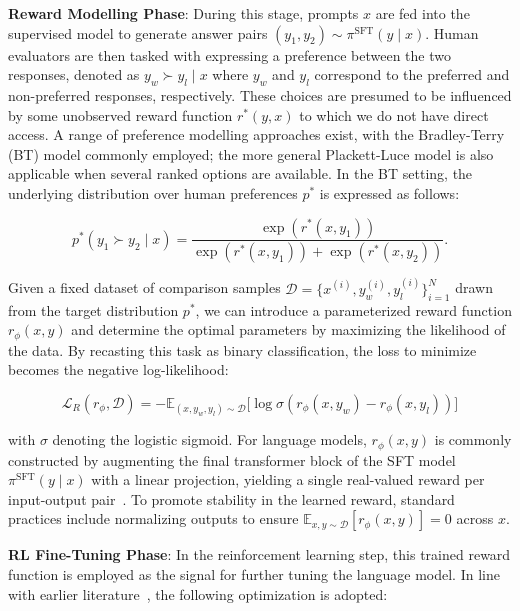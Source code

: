 \textbf{Reward Modelling Phase}: During this stage, prompts $x$ are fed into the supervised model to generate answer pairs $(y_1, y_2)\sim \pi^\text{SFT}(y \mid x)$. Human evaluators are then tasked with expressing a preference between the two responses, denoted as $y_w\succ y_l \mid x$ where $y_w$ and $y_l$ correspond to the preferred and non-preferred responses, respectively. These choices are presumed to be influenced by some unobserved reward function $r^*(y, x)$ to which we do not have direct access. A range of preference modelling approaches exist, with the Bradley-Terry (BT) model \cite{bradley1952rankanalysis} commonly employed; the more general Plackett-Luce model \citep{plackett1975analysis, luce2012individual} is also applicable when several ranked options are available. In the BT setting, the underlying distribution over human preferences $p^*$ is expressed as follows:

\begin{equation}\label{eq:bradley-terry}
    p^*(y_1\succ y_2 \mid x)=\frac{\exp\left(r^*(x, y_1)\right)}{\exp\left(r^*(x, y_1)\right) + \exp\left(r^*(x, y_2)\right)}.
\end{equation}

Given a fixed dataset of comparison samples $\mathcal{D}=\bigl\{x^{(i)}, y_w^{(i)}, y_l^{(i)}\bigr\}_{i=1}^N$ drawn from the target distribution $p^*$, we can introduce a parameterized reward function $r_{\phi}(x, y)$ and determine the optimal parameters by maximizing the likelihood of the data. By recasting this task as binary classification, the loss to minimize becomes the negative log-likelihood:

\begin{equation}\label{eq:reward_model}
    \mathcal{L}_R(r_{\phi}, \mathcal{D}) = -\mathbb{E}_{(x, y_w, y_l)\sim \mathcal{D}}\bigl[\log \sigma(r_{\phi}(x, y_w)- r_{\phi}(x, y_l))\bigr]
\end{equation}

with $\sigma$ denoting the logistic sigmoid. For language models, $r_{\phi}(x, y)$ is commonly constructed by augmenting the final transformer block of the SFT model $\pi^\text{SFT}(y \mid x)$ with a linear projection, yielding a single real-valued reward per input-output pair~\cite{ziegler2020finetuning}. To promote stability in the learned reward, standard practices include normalizing outputs to ensure $\mathbb{E}_{x,y\sim \mathcal{D}}\left[r_\phi(x, y)\right] = 0$ across $x$.

\textbf{RL Fine-Tuning Phase}: In the reinforcement learning step, this trained reward function is employed as the signal for further tuning the language model. In line with earlier literature~\citep{jaques2017sequence, jaques2020human}, the following optimization is adopted:

